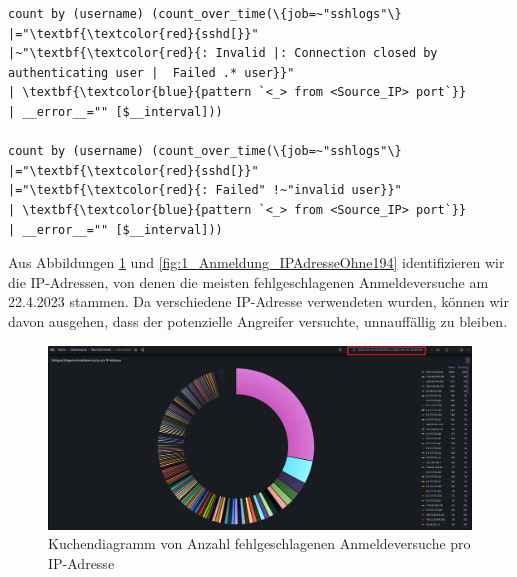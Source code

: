 {
\begin{Verbatim}[fontsize=\small,commandchars=\\\{\},frame=single]
count by (username) (count_over_time(\{job=~"sshlogs"\} 
|="\textbf{\textcolor{red}{sshd[}}"
|~"\textbf{\textcolor{red}{: Invalid |: Connection closed by authenticating user |  Failed .* user}}"
| \textbf{\textcolor{blue}{pattern `<_> from <Source_IP> port`}}
| __error__="" [$__interval]))

count by (username) (count_over_time(\{job=~"sshlogs"\}
|="\textbf{\textcolor{red}{sshd[}}"
|="\textbf{\textcolor{red}{: Failed" !~"invalid user}}"
| \textbf{\textcolor{blue}{pattern `<_> from <Source_IP> port`}}
| __error__="" [$__interval]))
\end{Verbatim}
}

Aus Abbildungen \ref{fig:1_Anmeldung_IPAdresse} und \ref{fig:1_Anmeldung_IPAdresseOhne194} identifizieren wir die IP-Adressen, von denen die meisten fehlgeschlagenen Anmeldeversuche am 22.4.2023 stammen. Da verschiedene IP-Adresse verwendeten wurden, können wir davon ausgehen, dass der potenzielle Angreifer versuchte, unnauffällig zu bleiben. 

\newpage
{}
\thispagestyle{lscape}
\begin{landscape}
    \begin{figure}[H]
        \centerline{\includegraphics[width=1.6\textwidth]{assets/Failed_pro_ip.png}}
        \caption[Kuchendiagramm von Anzahl fehlgeschlagenen Anmeldeversuche pro IP-Adresse]
        {Kuchendiagramm von Anzahl fehlgeschlagenen Anmeldeversuche pro IP-Adresse}
        \label{fig:1_Anmeldung_IPAdresse}
        \centering
    \end{figure}
\end{landscape}
\restoregeometry

